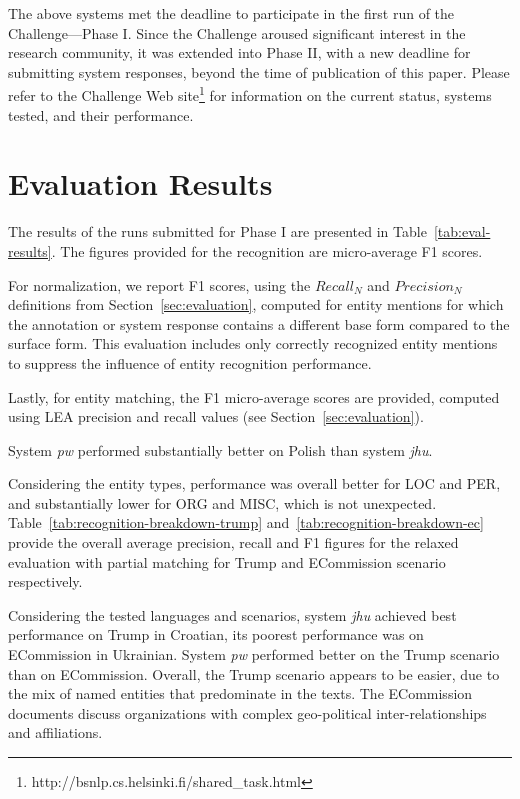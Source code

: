 \documentclass[11pt]{article}
\begin{document}
The above systems met the deadline to participate in the first run of the
Challenge---Phase I.
%
Since the Challenge aroused significant interest in the research
community, it was extended into Phase II, with a new deadline for
submitting system responses, beyond the time of publication of this
paper.  Please refer to the Challenge Web
site\footnote{http://bsnlp.cs.helsinki.fi/shared\_task.html} for
information on the current status, systems tested, and their performance.

\section{Evaluation Results}
\label{sec:results}

The results of the runs submitted for Phase I are presented in
Table~\ref{tab:eval-results}.  The figures provided for the recognition
are micro-average F1 scores.

For normalization, we report F1 scores, using the $Recall_{N}$ and
$Precision_{N}$ definitions from Section~\ref{sec:evaluation}, computed
for entity mentions for which the annotation or system response contains
a different base form compared to the surface form.  This evaluation
includes only correctly recognized entity mentions to suppress the
influence of entity recognition performance.

Lastly, for entity matching, the F1 micro-average scores are provided,
computed using LEA precision and recall values (see
Section~\ref{sec:evaluation}).

System {\em pw} performed substantially better on Polish than system {\em
  jhu}.

Considering the entity types, performance was overall better for LOC and
PER, and substantially lower for ORG and MISC, which is not unexpected. 
Table~\ref{tab:recognition-breakdown-trump} and~\ref{tab:recognition-breakdown-ec}
provide the overall average precision, recall and F1 figures for the relaxed evaluation
with partial matching for {\sc Trump} and {\sc ECommission} scenario respectively.

Considering the tested languages and scenarios, system {\em jhu} achieved
best performance on {\sc Trump} in Croatian, its poorest performance was
on {\sc ECommission} in Ukrainian.  System {\em pw} performed better on
the {\sc Trump} scenario than on {\sc ECommission}.  Overall, the {\sc
  Trump} scenario appears to be easier, due to the mix of named entities
that predominate in the texts.  The {\sc ECommission} documents discuss
organizations with complex geo-political inter-relationships and
affiliations.
\end{document}
